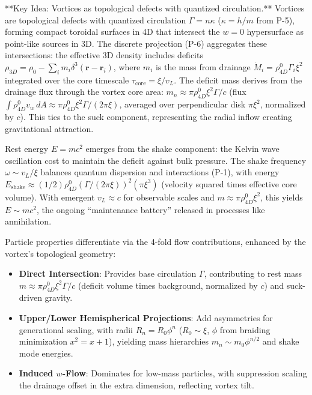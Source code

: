 **Key Idea: Vortices as topological defects with quantized circulation.** Vortices are topological defects with quantized circulation $\Gamma = n \kappa$ ($\kappa = h / m$ from P-5), forming compact toroidal surfaces in 4D that intersect the $w=0$ hypersurface as point-like sources in 3D. The discrete projection (P-6) aggregates these intersections: the effective 3D density includes deficits $\rho_{3D} = \rho_0 - \sum_i m_i \delta^3(\mathbf{r} - \mathbf{r}_i)$, where $m_i$ is the mass from drainage $\dot{M}_i = \rho_{4D}^0 \Gamma_i \xi^2$ integrated over the core timescale $\tau_{\text{core}} = \xi / v_L$. The deficit mass derives from the drainage flux through the vortex core area: $m_n \approx \pi \rho_{4D}^0 \xi^2 \Gamma / c$ (flux $\int \rho_{4D}^0 v_w \, dA \approx \pi \rho_{4D}^0 \xi^2 \Gamma / (2\pi \xi)$, averaged over perpendicular disk $\pi \xi^2$, normalized by $c$). This ties to the suck component, representing the radial inflow creating gravitational attraction.

Rest energy $E = m c^2$ emerges from the shake component: the Kelvin wave oscillation cost to maintain the deficit against bulk pressure. The shake frequency $\omega \sim v_L / \xi$ balances quantum dispersion and interactions (P-1), with energy $E_{\text{shake}} \approx (1/2) \rho_{4D}^0 (\Gamma / (2\pi \xi))^2 (\pi \xi^3)$ (velocity squared times effective core volume). With emergent $v_L \approx c$ for observable scales and $m \approx \pi \rho_{4D}^0 \xi^2$, this yields $E \sim m c^2$, the ongoing ``maintenance battery'' released in processes like annihilation.

Particle properties differentiate via the 4-fold flow contributions, enhanced by the vortex's topological geometry:
\begin{itemize}
\item \textbf{Direct Intersection}: Provides base circulation $\Gamma$, contributing to rest mass $m \approx \pi \rho_{4D}^0 \xi^2 \Gamma / c$ (deficit volume times background, normalized by $c$) and suck-driven gravity.
\item \textbf{Upper/Lower Hemispherical Projections}: Add asymmetries for generational scaling, with radii $R_n = R_0 \phi^n$ ($R_0 \sim \xi$, $\phi$ from braiding minimization $x^2 = x + 1$), yielding mass hierarchies $m_n \sim m_0 \phi^{n/2}$ and shake mode energies.
\item \textbf{Induced $w$-Flow}: Dominates for low-mass particles, with suppression scaling the drainage offset in the extra dimension, reflecting vortex tilt.
\end{itemize}

